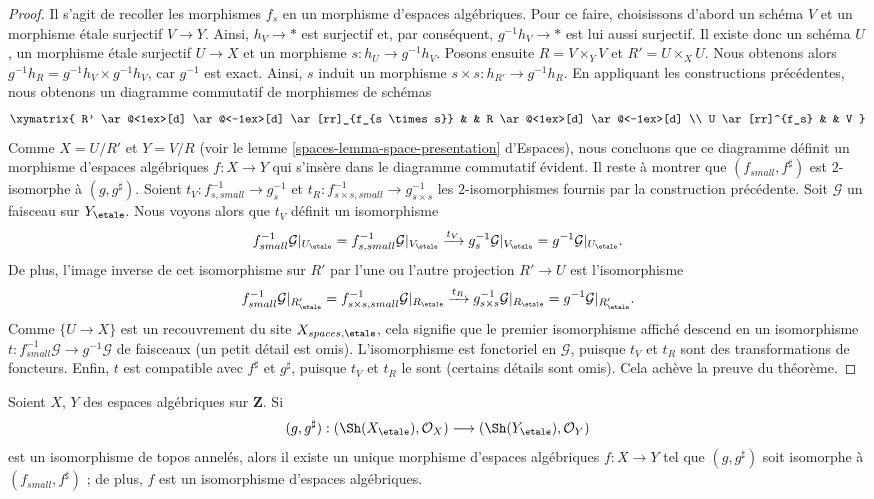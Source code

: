 \begin{proof}
\medskip\noindent
Il s'agit de recoller les morphismes $f_s$ en un morphisme d'espaces
algébriques. Pour ce faire, choisissons d'abord un schéma $V$ et un morphisme \'etale
surjectif $V \to Y$. Ainsi, $h_V \to *$ est surjectif et, par conséquent,
$g^{-1}h_V \to *$ est lui aussi surjectif. Il existe donc un schéma $U$,
un morphisme \'etale surjectif $U \to X$ et un morphisme
$s : h_U \to g^{-1}h_V$. Posons ensuite $R = V \times_Y V$ et
$R' = U \times_X U$. Nous obtenons alors
$g^{-1}h_R = g^{-1}h_V \times g^{-1}h_V$, car $g^{-1}$ est exact.
Ainsi, $s$ induit un morphisme $s \times s : h_{R'} \to g^{-1}h_R$.
En appliquant les constructions précédentes, nous obtenons un
diagramme commutatif de morphismes de schémas
$$
\xymatrix{
R' \ar@<1ex>[d] \ar@<-1ex>[d] \ar[rr]_{f_{s \times s}} & &
R \ar@<1ex>[d] \ar@<-1ex>[d] \\
U \ar[rr]^{f_s} & &
V
}
$$
Comme $X = U/R'$ et $Y = V/R$ (voir le
lemme \ref{spaces-lemma-space-presentation} d'Espaces),
nous concluons que ce diagramme
définit un morphisme d'espaces algébriques $f : X \to Y$ qui s'insère
dans le diagramme commutatif évident.
Il reste à montrer que $(f_{small}, f^\sharp)$ est
$2$-isomorphe à $(g, g^\sharp)$.
Soient $t_V : f_{s, small}^{-1} \to g_s^{-1}$ et
$t_R : f_{s \times s, small}^{-1} \to g_{s \times s}^{-1}$ les
$2$-isomorphismes fournis par la construction précédente.
Soit $\mathcal{G}$ un faisceau sur $Y_\etale$. Nous voyons alors que
$t_V$ définit un isomorphisme
$$
f_{small}^{-1}\mathcal{G}|_{U_\etale}
=
f_{s, small}^{-1}\mathcal{G}|_{V_\etale}
\xrightarrow{t_V}
g_s^{-1}\mathcal{G}|_{V_\etale}
=
g^{-1}\mathcal{G}|_{U_\etale}.
$$
De plus, l'image inverse de cet isomorphisme sur $R'$ par l'une ou l'autre projection
$R' \to U$ est l'isomorphisme
$$
f_{small}^{-1}\mathcal{G}|_{R'_\etale}
=
f_{s \times s, small}^{-1}\mathcal{G}|_{R_\etale}
\xrightarrow{t_R}
g_{s \times s}^{-1}\mathcal{G}|_{R_\etale}
=
g^{-1}\mathcal{G}|_{R'_\etale}.
$$
Comme $\{U \to X\}$ est un recouvrement du site $X_{spaces, \etale}$,
cela signifie que le premier isomorphisme affiché descend en un isomorphisme
$t : f_{small}^{-1}\mathcal{G} \to g^{-1}\mathcal{G}$
de faisceaux (un petit détail est omis). L'isomorphisme est fonctoriel
en $\mathcal{G}$, puisque $t_V$ et $t_R$ sont des transformations de foncteurs.
Enfin, $t$ est compatible avec $f^\sharp$ et $g^\sharp$, puisque
$t_V$ et $t_R$ le sont (certains détails sont omis).
Cela achève la preuve du théorème.
\end{proof}

\begin{lemma}
\label{lemma-isomorphism-ringed-topoi}
Soient $X$, $Y$ des espaces algébriques sur $\mathbf{Z}$. Si
$$
(g, g^\sharp) :
(\Sh(X_\etale), \mathcal{O}_X)
\longrightarrow
(\Sh(Y_\etale), \mathcal{O}_Y)
$$
est un isomorphisme de topos annelés, alors il existe un unique
morphisme d'espaces algébriques $f : X \to Y$ tel que
$(g, g^\sharp)$ soit isomorphe à $(f_{small}, f^\sharp)$ ;
de plus, $f$ est un isomorphisme d'espaces algébriques.
\end{lemma}

